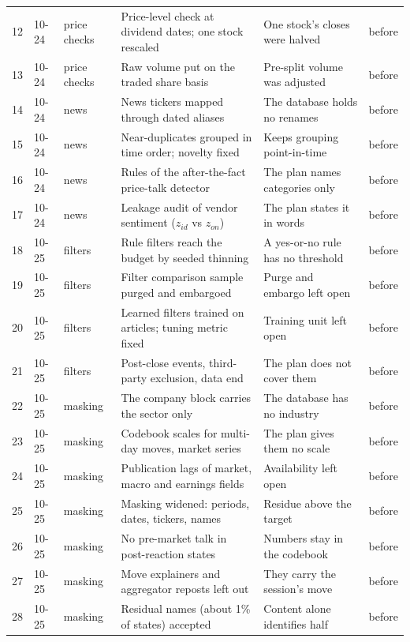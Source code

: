 \begin{longtable}{@{}rll>{\raggedright\arraybackslash}p{2.85in}>{\raggedright\arraybackslash}p{1.7in}l@{}}
12 & 10-24 & price checks & Price-level check at dividend dates; one stock rescaled & One stock's closes were halved & before \\
13 & 10-24 & price checks & Raw volume put on the traded share basis & Pre-split volume was adjusted & before \\
14 & 10-24 & news & News tickers mapped through dated aliases & The database holds no renames & before \\
15 & 10-24 & news & Near-duplicates grouped in time order; novelty fixed & Keeps grouping point-in-time & before \\
16 & 10-24 & news & Rules of the after-the-fact price-talk detector & The plan names categories only & before \\
17 & 10-24 & news & Leakage audit of vendor sentiment ($z_{id}$ vs $z_{on}$) & The plan states it in words & before \\
18 & 10-25 & filters & Rule filters reach the budget by seeded thinning & A yes-or-no rule has no threshold & before \\
19 & 10-25 & filters & Filter comparison sample purged and embargoed & Purge and embargo left open & before \\
20 & 10-25 & filters & Learned filters trained on articles; tuning metric fixed & Training unit left open & before \\
21 & 10-25 & filters & Post-close events, third-party exclusion, data end & The plan does not cover them & before \\
22 & 10-25 & masking & The company block carries the sector only & The database has no industry & before \\
23 & 10-25 & masking & Codebook scales for multi-day moves, market series & The plan gives them no scale & before \\
24 & 10-25 & masking & Publication lags of market, macro and earnings fields & Availability left open & before \\
25 & 10-25 & masking & Masking widened: periods, dates, tickers, names & Residue above the target & before \\
26 & 10-25 & masking & No pre-market talk in post-reaction states & Numbers stay in the codebook & before \\
27 & 10-25 & masking & Move explainers and aggregator reposts left out & They carry the session's move & before \\
28 & 10-25 & masking & Residual names (about 1\% of states) accepted & Content alone identifies half & before \\

\end{longtable}
